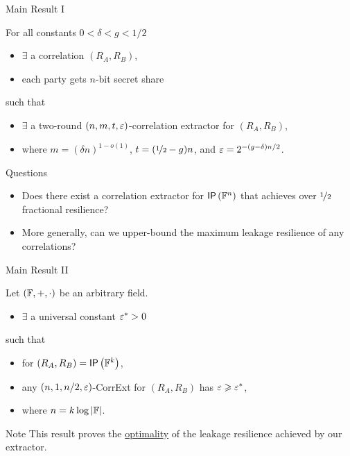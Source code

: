 \begin{frame}{Main Result I}
	\begin{theorem}
	\label{thm:construction}
	For all constants $0<\delta<g<1/2$
	\begin{itemize}
		\item $ \exists $ a correlation $(R_A,R_B)$, 
		\item each party gets $n$-bit secret share
	\end{itemize}
	such that 
	\begin{itemize}
		\item $ \exists $ a two-round $(n,m,t,\varepsilon)$-correlation extractor for $(R_A,R_B)$,
		\item where $m=(\delta n)^{1-o(1)}$, \pause $t=(\nicefrac12-g)n$, \pause and $\varepsilon=2^{-(g-\delta)n/2}$.
	\end{itemize} 
	\end{theorem}
	\pause
	{
	\begin{block}{Questions}
		\begin{itemize}
		\item Does there exist a correlation extractor for $ \IP[\bbF^n] $ that achieves over $ \nicefrac{1}{2} $ fractional resilience? \pause
		\item More generally, can we upper-bound the maximum leakage resilience of any correlations? 
		\end{itemize}
	\end{block}
	}
\end{frame}

\begin{frame}{Main Result II}
	\begin{theorem}
	\label{thm:hardness} 
	Let $({\mathbb F},+,\cdot)$ be an arbitrary field.
	\begin{itemize}
		\item $ \exists $ a universal constant $\varepsilon^*>0$
	\end{itemize}
	such that
	\begin{itemize}
		\item  for $(R_A,R_B)=\IP [\bbF^k] $, %
		\item any $(n,1,%
		n/2,\eps)$-CorrExt for $(R_A,R_B)$ has $\varepsilon\geqslant\varepsilon^*$,
		\item  where $n=k\log\left\vert{\ensuremath{{\mathbb F}}}\right\vert$.  
	\end{itemize}
\end{theorem}

{
\begin{block}{Note}
	This result proves the \underline{optimality} of the leakage resilience achieved by our extractor.
\end{block}}

\end{frame}